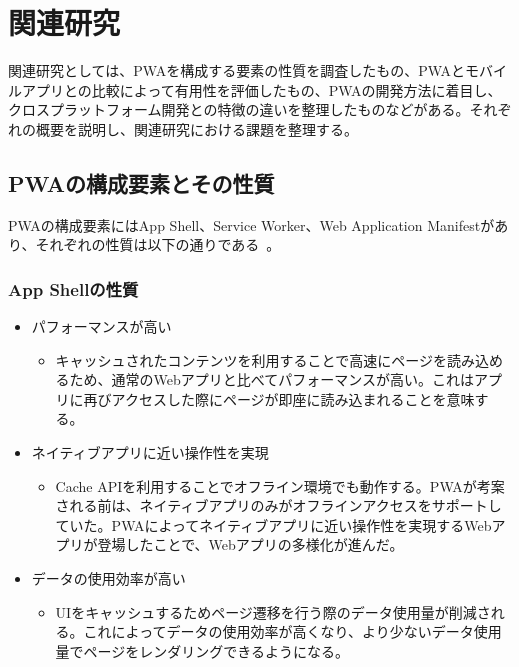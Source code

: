 \section{関連研究}\label{section:関連研究}
関連研究としては、PWAを構成する要素の性質を調査したもの、PWAとモバイルアプリとの比較によって有用性を評価したもの、PWAの開発方法に着目し、クロスプラットフォーム開発との特徴の違いを整理したものなどがある。それぞれの概要を説明し、関連研究における課題を整理する。
\subsection{PWAの構成要素とその性質}\label{subsection:PWAの構成要素とその性質}
PWAの構成要素にはApp Shell、Service Worker、Web Application Manifestがあり、それぞれの性質は以下の通りである~\cite{Tandel2018ProgressiveWebApps}。
\subsubsection{App Shellの性質}\label{subsubsection:App Shellの性質}
\begin{itemize}
    \item パフォーマンスが高い
    \begin{itemize}
      \item キャッシュされたコンテンツを利用することで高速にページを読み込めるため、通常のWebアプリと比べてパフォーマンスが高い。これはアプリに再びアクセスした際にページが即座に読み込まれることを意味する。
    \end{itemize}
    \item ネイティブアプリに近い操作性を実現
    \begin{itemize}
        \item Cache APIを利用することでオフライン環境でも動作する。PWAが考案される前は、ネイティブアプリのみがオフラインアクセスをサポートしていた。PWAによってネイティブアプリに近い操作性を実現するWebアプリが登場したことで、Webアプリの多様化が進んだ。
    \end{itemize}
    \item データの使用効率が高い
    \begin{itemize}
        \item UIをキャッシュするためページ遷移を行う際のデータ使用量が削減される。これによってデータの使用効率が高くなり、より少ないデータ使用量でページをレンダリングできるようになる。
    \end{itemize}
\end{itemize}
